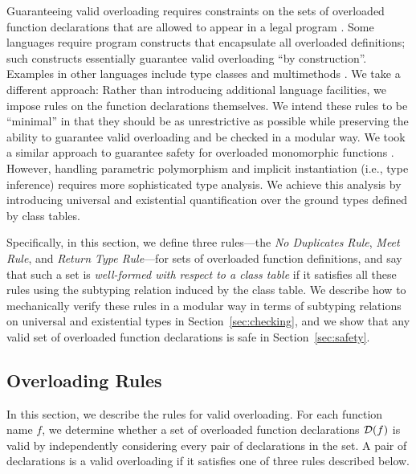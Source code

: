 
Guaranteeing valid overloading requires constraints on the sets of overloaded function declarations
that are allowed to appear in a legal program \cite{millstein02,millstein03}.
Some languages require program constructs that encapsulate all overloaded definitions;
such constructs essentially guarantee valid overloading ``by construction''.
Examples in other languages include type classes \cite{wadler89,dreyer07,siek05}
and multimethods \cite{millstein02,millstein03,bourdoncle97}.
We take a different approach: Rather than introducing additional language facilities,
we impose rules on the function declarations themselves.
We intend these rules to be ``minimal'' in that they should be as unrestrictive as possible
while preserving the ability to guarantee valid overloading and be checked in a modular way.
We took a similar approach to guarantee safety for overloaded monomorphic functions \cite{allen07}.
However, handling parametric polymorphism and implicit instantiation (i.e., type inference)
requires more sophisticated type analysis.
We achieve this analysis by introducing universal and existential quantification
over the ground types defined by class tables.

Specifically, in this section, we define three rules---the \emph{No Duplicates Rule},
\emph{Meet Rule}, and \emph{Return Type Rule}---for sets of overloaded function definitions,
and say that such a set is \emph{well-formed with respect to a class table}
if it satisfies all these rules using the subtyping relation induced by the class table.
We describe how to mechanically verify these rules in a modular way
in terms of subtyping relations on universal and existential types in Section~\ref{sec:checking},
and we show that any valid set of overloaded function declarations is safe in Section~\ref{sec:safety}.

\subsection{Overloading Rules}\label{sec:threerules}
In this section, we describe the rules for valid overloading.
For each function name $f$,
we determine whether a set of overloaded function declarations $\mathcal{D}(f)$ is valid
by independently considering every pair of declarations in the set.
A pair of declarations is a valid overloading if it satisfies one of three rules described below.


